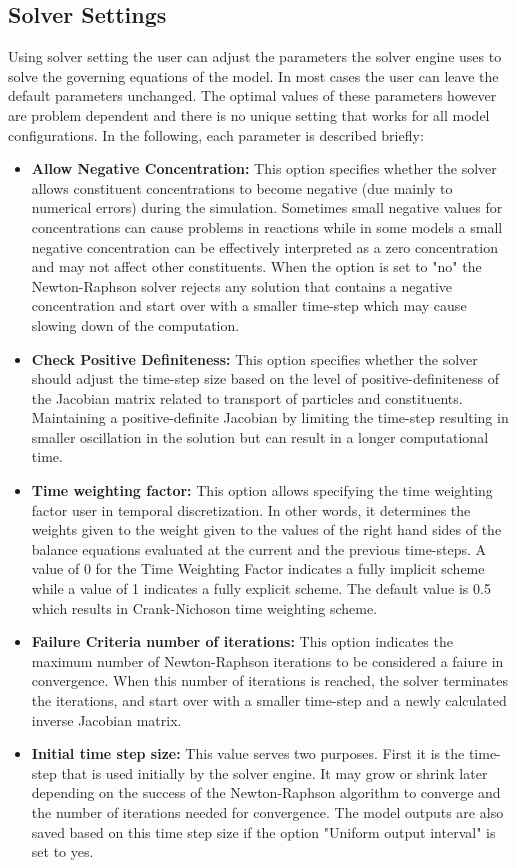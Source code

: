 \subsection{Solver Settings}
Using solver setting the user can adjust the parameters the solver engine uses to solve the governing equations of the model. In most cases the user can leave the default parameters unchanged. The optimal values of these parameters however are problem dependent and there is no unique setting that works for all model configurations. In the following, each parameter is described briefly:
\begin{itemize}
\item \textbf{Allow Negative Concentration: } This option specifies whether the solver allows constituent concentrations to become negative (due mainly to numerical errors) during the simulation. Sometimes small negative values for concentrations can cause problems in reactions while in some models a small negative concentration can be effectively interpreted as a zero concentration and may not affect other constituents. When the option is set to "no" the Newton-Raphson solver rejects any solution that contains a negative concentration and start over with a smaller time-step which may cause slowing down of the computation. 
\item \textbf{Check Positive Definiteness: } This option specifies whether the solver should adjust the time-step size based on the level of positive-definiteness of the Jacobian matrix related to transport of particles and constituents. Maintaining a positive-definite Jacobian by limiting the time-step resulting in smaller oscillation in the solution but can result in a longer computational time.
\item \textbf{Time weighting factor: } This option allows specifying the time weighting factor user in temporal discretization. In other words, it determines the weights given to the weight given to the values of the right hand sides of the balance equations evaluated at the current and the previous time-steps. A value of 0 for the Time Weighting Factor indicates a fully implicit scheme while a value of 1 indicates a fully explicit scheme. The default value is 0.5 which results in Crank-Nichoson time weighting scheme. 
\item \textbf{Failure Criteria number of iterations: } This option indicates the maximum number of Newton-Raphson iterations to be considered a faiure in convergence. When this number of iterations is reached, the solver terminates the iterations, and start over with a smaller time-step and a newly calculated inverse Jacobian matrix. \item \textbf{Initial time step size: }  This value serves two purposes. First it is the time-step that is used initially by the solver engine. It may grow or shrink later depending on the success of the Newton-Raphson algorithm to converge and the number of iterations needed for convergence. The model outputs are also saved based on this time step size if the option "Uniform output interval" is set to yes. 

\end{itemize}
